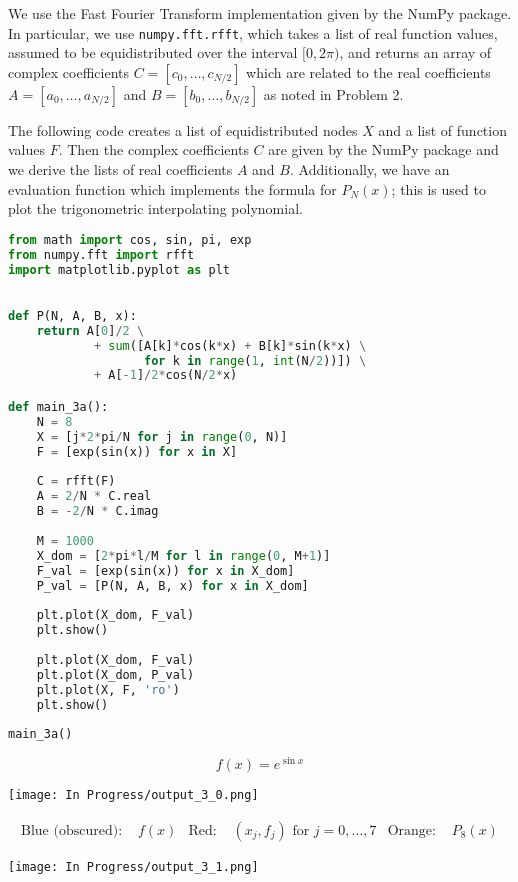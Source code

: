 \documentclass[12pt]{article}
\newcommand{\<}{\left\langle}
\renewcommand{\>}{\right\rangle}
\begin{document}
We use the Fast Fourier Transform implementation given by the NumPy package. In particular, we use \lstinline{numpy.fft.rfft}, which takes a list of real function values, assumed to be equidistributed over the interval $[0, 2\pi)$, and returns an array of complex coefficients $C = [c_0, \dots, c_{N/2}]$ which are related to the real coefficients $A = [a_0, \dots, a_{N/2}]$ and $B = [b_0, \dots, b_{N/2}]$ as noted in Problem 2.

The following code creates a list of equidistributed nodes $X$ and a list of function values $F$. Then the complex coefficients $C$ are given by the NumPy package and we derive the lists of real coefficients $A$ and $B$. Additionally, we have an evaluation function which implements the formula for $P_N(x)$; this is used to plot the trigonometric interpolating polynomial.

\begin{lstlisting}[language=Python]
from math import cos, sin, pi, exp
from numpy.fft import rfft
import matplotlib.pyplot as plt
        

def P(N, A, B, x):
    return A[0]/2 \
            + sum([A[k]*cos(k*x) + B[k]*sin(k*x) \
                   for k in range(1, int(N/2))]) \
            + A[-1]/2*cos(N/2*x)

def main_3a():
    N = 8
    X = [j*2*pi/N for j in range(0, N)]
    F = [exp(sin(x)) for x in X]
    
    C = rfft(F)
    A = 2/N * C.real
    B = -2/N * C.imag
    
    M = 1000
    X_dom = [2*pi*l/M for l in range(0, M+1)]
    F_val = [exp(sin(x)) for x in X_dom]
    P_val = [P(N, A, B, x) for x in X_dom]
    
    plt.plot(X_dom, F_val)
    plt.show()
    
    plt.plot(X_dom, F_val)
    plt.plot(X_dom, P_val)
    plt.plot(X, F, 'ro')
    plt.show()
    
main_3a()
\end{lstlisting}

\newpage
\[
    f(x) = e^{\sin x}
\]
\begin{center}
    \texttt{[image: In Progress/output\_3\_0.png]}
\end{center}

\begin{align*}
    \text{Blue (obscured): } & f(x) 
    & \text{Red: } & (x_j, f_j) \text{ for } j = 0, \dots, 7 
    & \text{Orange: } & P_8(x)
\end{align*}
\begin{center}
    \texttt{[image: In Progress/output\_3\_1.png]}
\end{center}
\end{document}

